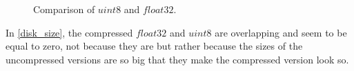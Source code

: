 \documentclass[12pt, a4paper]{report}
\begin{document}
		\begin{figure}[h!]
			\centering
			\hfill
			\vfill
			\caption{Comparison of $uint8$ and $float32$.}
			\label{dtypes}
		\end{figure}
		In \ref{disk_size}, the compressed $float32$ and $uint8$ are overlapping and seem to be equal to zero, not because they are but rather because the sizes of the uncompressed versions are so big that they make the compressed version look so.
\end{document}
